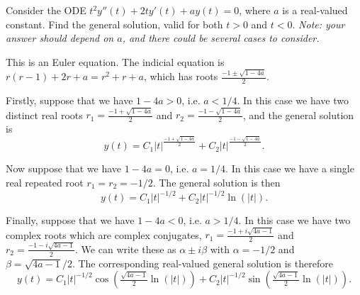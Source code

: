 \documentclass[addpoints]{exam}
\begin{document}
\begin{questions}

\begin{question}[25]

Consider the ODE $t^2y''(t) + 2ty'(t) + ay(t) = 0$, where $a$ is a real-valued constant. Find the general solution, valid for both $t > 0$ and $t < 0$. {\em Note: your answer should depend on $a$, and there could be several cases to consider.}

\end{question}

\begin{solution}
This is an Euler equation. The indicial equation is $r(r-1) + 2r + a = r^2 +r +a$, which has roots
$\frac{-1 \pm \sqrt{1-4a}}{2}$.

Firstly, suppose that we have $1-4a > 0$, i.e. $a < 1/4$.
In this case we have two distinct real roots
$r_1 = \frac{-1 + \sqrt{1-4a}}{2}$ and $r_2 = \frac{-1 - \sqrt{1-4a}}{2}$,
and the general solution is
$$y(t) = C_1|t|^{\tfrac{-1 + \sqrt{1-4a}}{2}} + C_2|t|^{\tfrac{-1 - \sqrt{1-4a}}{2}}.$$

Now suppose that we have $1-4a = 0$, i.e. $a = 1/4$.
In this case we have a single real repeated root
$r_1 = r_2 = -1/2$.
The general solution is then
$$y(t) = C_1|t|^{-1/2} + C_2|t|^{-1/2}\ln(|t|).$$

Finally, suppose that we have $1-4a < 0$, i.e. $a > 1/4$.
In this case we have two complex roots which are complex conjugates,
$r_1 = \frac{-1 + i\sqrt{4a-1}}{2}$ and $r_2 = \frac{-1 - i\sqrt{4a-1}}{2}$.
We can write these as $\alpha \pm i \beta$ with $\alpha = -1/2$ and $\beta = \sqrt{4a-1}/2$.
The corresponding real-valued general solution is therefore
$$y(t) = C_1|t|^{-1/2}\cos\left(\tfrac{\sqrt{4a-1}}{2}\ln(|t|)\right) + C_2|t|^{-1/2}\sin\left(\tfrac{\sqrt{4a-1}}{2}\ln(|t|)\right).$$

\end{solution}

\break

\begin{question}

\end{question}
\end{questions}
\end{document}
